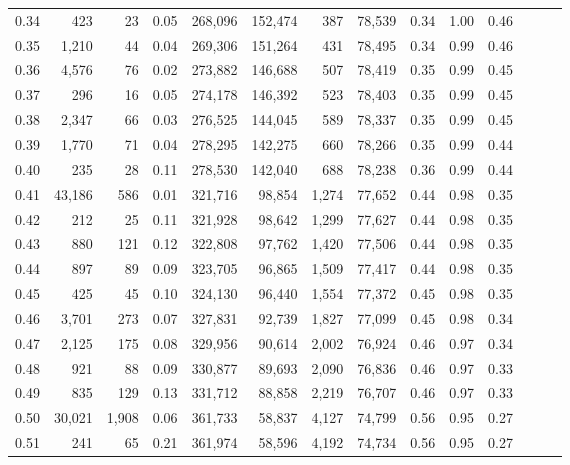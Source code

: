 \begin{tabular}{rrrrrrrrrrrrrr}
0.34 &     423 &      23 &  0.05 &  268,096 &  152,474 &     387 &  78,539 &  0.34 &  1.00 &      0.46 \\
0.35 &   1,210 &      44 &  0.04 &  269,306 &  151,264 &     431 &  78,495 &  0.34 &  0.99 &      0.46 \\
0.36 &   4,576 &      76 &  0.02 &  273,882 &  146,688 &     507 &  78,419 &  0.35 &  0.99 &      0.45 \\
0.37 &     296 &      16 &  0.05 &  274,178 &  146,392 &     523 &  78,403 &  0.35 &  0.99 &      0.45 \\
0.38 &   2,347 &      66 &  0.03 &  276,525 &  144,045 &     589 &  78,337 &  0.35 &  0.99 &      0.45 \\
0.39 &   1,770 &      71 &  0.04 &  278,295 &  142,275 &     660 &  78,266 &  0.35 &  0.99 &      0.44 \\
0.40 &     235 &      28 &  0.11 &  278,530 &  142,040 &     688 &  78,238 &  0.36 &  0.99 &      0.44 \\
0.41 &  43,186 &     586 &  0.01 &  321,716 &   98,854 &   1,274 &  77,652 &  0.44 &  0.98 &      0.35 \\
0.42 &     212 &      25 &  0.11 &  321,928 &   98,642 &   1,299 &  77,627 &  0.44 &  0.98 &      0.35 \\
0.43 &     880 &     121 &  0.12 &  322,808 &   97,762 &   1,420 &  77,506 &  0.44 &  0.98 &      0.35 \\
0.44 &     897 &      89 &  0.09 &  323,705 &   96,865 &   1,509 &  77,417 &  0.44 &  0.98 &      0.35 \\
0.45 &     425 &      45 &  0.10 &  324,130 &   96,440 &   1,554 &  77,372 &  0.45 &  0.98 &      0.35 \\
0.46 &   3,701 &     273 &  0.07 &  327,831 &   92,739 &   1,827 &  77,099 &  0.45 &  0.98 &      0.34 \\
0.47 &   2,125 &     175 &  0.08 &  329,956 &   90,614 &   2,002 &  76,924 &  0.46 &  0.97 &      0.34 \\
0.48 &     921 &      88 &  0.09 &  330,877 &   89,693 &   2,090 &  76,836 &  0.46 &  0.97 &      0.33 \\
0.49 &     835 &     129 &  0.13 &  331,712 &   88,858 &   2,219 &  76,707 &  0.46 &  0.97 &      0.33 \\
0.50 &  30,021 &   1,908 &  0.06 &  361,733 &   58,837 &   4,127 &  74,799 &  0.56 &  0.95 &      0.27 \\
0.51 &     241 &      65 &  0.21 &  361,974 &   58,596 &   4,192 &  74,734 &  0.56 &  0.95 &      0.27 \\

\end{tabular}
